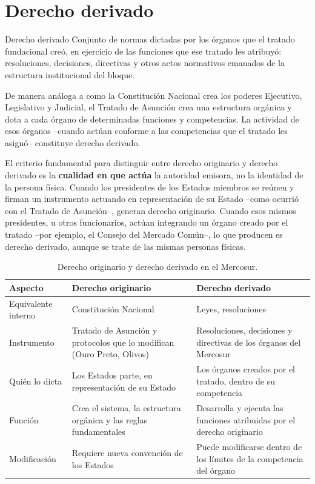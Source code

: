 \documentclass[12pt,oneside]{book}
\begin{document}
\section{Derecho derivado}

\begin{definicion}{Derecho derivado}
Conjunto de normas dictadas por los órganos que el tratado fundacional creó, en ejercicio de las funciones que ese tratado les atribuyó: resoluciones, decisiones, directivas y otros actos normativos emanados de la estructura institucional del bloque.
\end{definicion}

De manera análoga a como la Constitución Nacional crea los poderes Ejecutivo, Legislativo y Judicial, el Tratado de Asunción crea una estructura orgánica y dota a cada órgano de determinadas funciones y competencias. La actividad de esos órganos --cuando actúan conforme a las competencias que el tratado les asignó-- constituye derecho derivado.

\begin{importante}
El criterio fundamental para distinguir entre derecho originario y derecho derivado es la \textbf{cualidad en que actúa} la autoridad emisora, no la identidad de la persona física. Cuando los presidentes de los Estados miembros se reúnen y firman un instrumento actuando en representación de su Estado --como ocurrió con el Tratado de Asunción--, generan derecho originario. Cuando esos mismos presidentes, u otros funcionarios, actúan integrando un órgano creado por el tratado --por ejemplo, el Consejo del Mercado Común--, lo que producen es derecho derivado, aunque se trate de las mismas personas físicas.
\end{importante}

\begin{table}[H]
\centering
\renewcommand{\arraystretch}{1.3}
\begin{tabularx}{\textwidth}{>{\raggedright\arraybackslash}p{}>{\raggedright\arraybackslash}X>{\raggedright\arraybackslash}X}
\toprule
\textbf{Aspecto} & \textbf{Derecho originario} & \textbf{Derecho derivado} \\
\midrule
Equivalente interno & Constitución Nacional & Leyes, resoluciones \\
Instrumento & Tratado de Asunción y protocolos que lo modifican (Ouro Preto, Olivos) & Resoluciones, decisiones y directivas de los órganos del Mercosur \\
Quién lo dicta & Los Estados parte, en representación de su Estado & Los órganos creados por el tratado, dentro de su competencia \\
Función & Crea el sistema, la estructura orgánica y las reglas fundamentales & Desarrolla y ejecuta las funciones atribuidas por el derecho originario \\
Modificación & Requiere nueva convención de los Estados & Puede modificarse dentro de los límites de la competencia del órgano \\
\bottomrule
\end{tabularx}
\caption{Derecho originario y derecho derivado en el Mercosur.}
\end{table}
\end{document}
